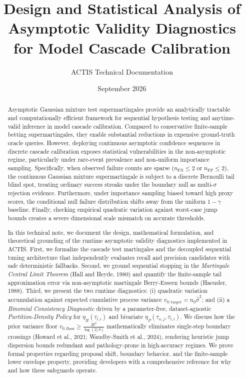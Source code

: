 \documentclass[11pt,a4paper]{article}
\title{\textbf{Design and Statistical Analysis of Asymptotic Validity Diagnostics for Model Cascade Calibration}}
\author{ACTIS Technical Documentation}
\date{September 2026}
\begin{document}
\maketitle

\begin{abstract}
Asymptotic Gaussian mixture test supermartingales provide an analytically tractable and computationally efficient framework for sequential hypothesis testing and anytime-valid inference in model cascade calibration. Compared to conservative finite-sample betting supermartingales, they enable substantial reductions in expensive ground-truth oracle queries. However, deploying continuous asymptotic confidence sequences in discrete cascade calibration exposes statistical vulnerabilities in the non-asymptotic regime, particularly under rare-event prevalence and non-uniform importance sampling.
Specifically, when observed failure counts are sparse ($n_{\text{FN}} \le 2$ or $n_{\text{FP}} \le 2$), the continuous Gaussian mixture supermartingale is subject to a discrete Bernoulli tail blind spot, treating ordinary success streaks under the boundary null as multi-$\sigma$ rejection evidence. Furthermore, under importance sampling biased toward high proxy scores, the conditional null failure distribution shifts away from the uniform $1 - \gamma$ baseline. Finally, checking empirical quadratic variation against worst-case jump bounds creates a severe dimensional scale mismatch on accurate thresholds.

In this technical note, we document the design, mathematical formulation, and theoretical grounding of the runtime asymptotic validity diagnostics implemented in ACTIS. First, we formalize the cascade test martingales and the decoupled sequential tuning architecture that independently evaluates recall and precision candidates with safe deterministic fallbacks. Second, we ground sequential stopping in the \emph{Martingale Central Limit Theorem} (Hall and Heyde, 1980) and quantify the finite-sample tail approximation error via non-asymptotic martingale Berry-Esseen bounds (Haeusler, 1988). Third, we present the two runtime diagnostics: (i) quadratic variation accumulation against expected cumulative process variance $v_{0, \text{target}} = n_0 \hat{\sigma}^2$; and (ii) a \emph{Binomial Consistency Diagnostic} driven by a parameter-free, dataset-agnostic \emph{Partition-Density Policy} for $\eta_R(\tau_{l, i})$ and bivariate $\eta_P(\tau_{u, j}, \tau_{l, i})$. We discuss how the prior variance floor $v_{0, \text{floor}} \ge \frac{2 b^2}{\log(2/\delta)}$ mathematically eliminates single-step boundary crossings (Howard et al., 2021; Waudby-Smith et al., 2024), rendering heuristic jump dispersion bounds redundant and pathology-prone in high-accuracy regimes. We prove formal properties regarding proposal shift, boundary behavior, and the finite-sample lower envelope property, providing developers with a comprehensive reference for why and how these safeguards operate.
\end{abstract}
\end{document}
